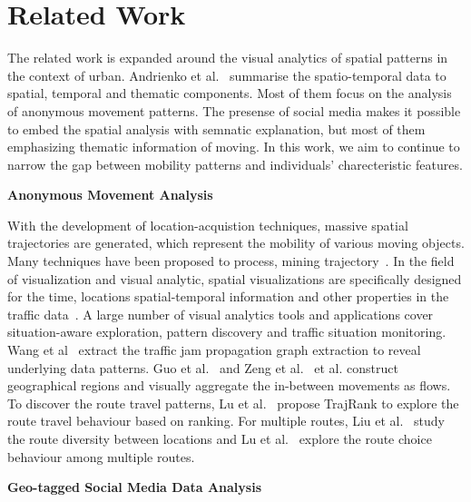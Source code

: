 \section{Related Work}

The related work is expanded around the visual analytics of spatial patterns in the context of urban. Andrienko et al.~\cite{andrienko2013visual} summarise the spatio-temporal data to spatial, temporal and thematic components. Most of them focus on the analysis of anonymous movement patterns. The presense of social media makes it possible to embed the spatial analysis with semnatic explanation, but most of them emphasizing thematic information of moving. In this work, we aim to continue to narrow the gap between mobility patterns and individuals' charecteristic features. 

\textbf{Anonymous Movement Analysis} 
 
 With the development of location-acquistion techniques, massive spatial trajectories are generated, which represent the mobility of various moving objects. Many techniques have been proposed to process, mining trajectory~\cite{Zheng2015_trajectory}. In the field of visualization and visual analytic, spatial visualizations are specifically designed for the time, locations spatial-temporal information and other properties in the traffic data~\cite{chen2015survey}. A large number of visual analytics tools and applications cover situation-aware exploration, pattern discovery and traffic situation monitoring. Wang et al~\cite{wang2013visual} extract the traffic jam propagation graph extraction to reveal underlying data patterns. Guo et al.~\cite{guo2011tripvista} and Zeng et al.~\cite{zeng2013visualizing} et al. construct geographical regions and visually aggregate the in-between movements as flows. To discover the route travel patterns, Lu et al.~\cite{lu2015trajrank} propose TrajRank to explore the route travel behaviour based on ranking. For multiple routes, Liu et al.~\cite{liu2011_routediversity} study the route diversity between locations and Lu et al.~\cite{Lu2017_multipleroute} explore the route choice behaviour among multiple routes.


\textbf{Geo-tagged Social Media Data Analysis}

